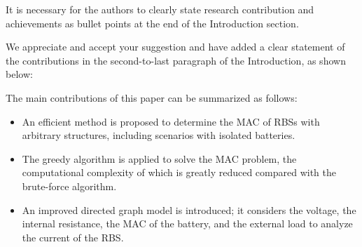 \begin{revcomment}
  It is necessary for the authors to clearly state research contribution and achievements as bullet points at the end of the Introduction section.
\end{revcomment}
\begin{revresponse}

We appreciate and accept your suggestion and have added a clear statement of the contributions in the second-to-last paragraph of the Introduction, as shown below:
\begin{changes}
The main contributions of this paper can be summarized as follows:
\begin{itemize}
  \item An efficient method is proposed to determine the MAC of RBSs with arbitrary structures, including scenarios with isolated batteries.
  \item The greedy algorithm is applied to solve the MAC problem, the computational complexity of which is greatly reduced compared with the brute-force algorithm.
  \item An improved directed graph model is introduced; it considers the voltage, the internal resistance, the MAC of the battery, and the external load to analyze the current of the RBS.
\end{itemize}
\end{changes}


\end{revresponse}

